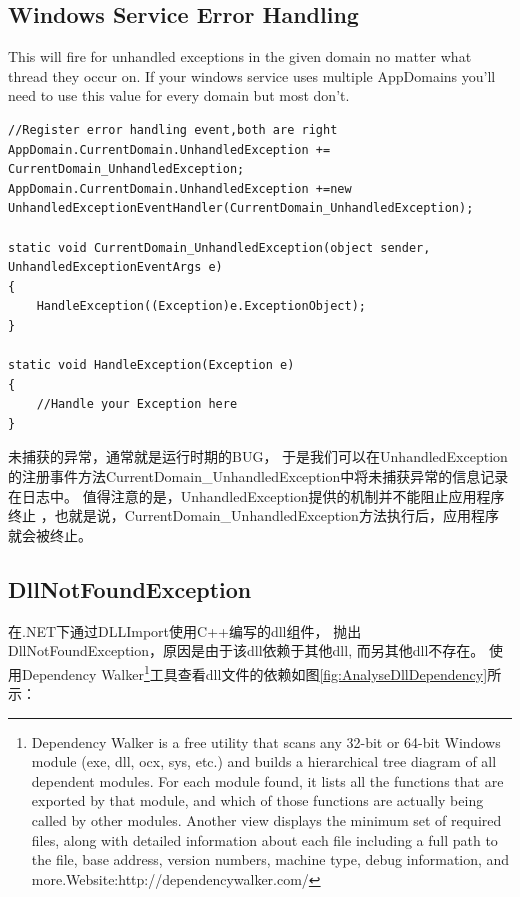 \documentclass{book}
\begin{document}
\subsection{Windows Service Error Handling}

This will fire for unhandled exceptions in the given domain 
no matter what thread they occur on. If your windows service 
uses multiple AppDomains you'll need to use this value for every domain but most don't.

\begin{lstlisting}[language={[Sharp]C}]
//Register error handling event,both are right
AppDomain.CurrentDomain.UnhandledException += CurrentDomain_UnhandledException;
AppDomain.CurrentDomain.UnhandledException +=new UnhandledExceptionEventHandler(CurrentDomain_UnhandledException);

static void CurrentDomain_UnhandledException(object sender, UnhandledExceptionEventArgs e)
{
    HandleException((Exception)e.ExceptionObject);
}

static void HandleException(Exception e)
{
    //Handle your Exception here
}
\end{lstlisting}

未捕获的异常，通常就是运行时期的BUG，
于是我们可以在UnhandledException 的注册事件方法CurrentDomain\_UnhandledException中将未捕获异常的信息记录在日志中。
值得注意的是，UnhandledException提供的机制并不能阻止应用程序终止
，也就是说，CurrentDomain\_UnhandledException方法执行后，应用程序就会被终止。

\subsection{DllNotFoundException}

在.NET下通过DLLImport使用C++编写的dll组件，
抛出DllNotFoundException，原因是由于该dll依赖于其他dll, 而另其他dll不存在。
使用Dependency Walker\footnote{Dependency Walker is a free utility that scans any 32-bit or 64-bit Windows module (exe, dll, ocx, sys, etc.) 
and builds a hierarchical tree diagram of all dependent modules. 
For each module found, it lists all the functions that are exported by that module, 
and which of those functions are actually being called by other modules. Another view displays the minimum set of required files, 
along with detailed information about each file including a full path to the file, base address, 
version numbers, machine type, debug information, and more.Website:http://dependencywalker.com/}工具查看dll文件的依赖如图\ref{fig:AnalyseDllDependency}所示：
\end{document}
